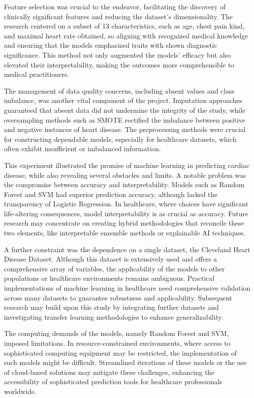 Feature selection was crucial to the endeavor, facilitating the discovery of clinically significant features and reducing the dataset's dimensionality. The research centered on a subset of 13 characteristics, such as age, chest pain kind, and maximal heart rate obtained, so aligning with recognized medical knowledge and ensuring that the models emphasized traits with shown diagnostic significance. This method not only augmented the models' efficacy but also elevated their interpretability, making the outcomes more comprehensible to medical practitioners.

The management of data quality concerns, including absent values and class imbalance, was another vital component of the project. Imputation approaches guaranteed that absent data did not undermine the integrity of the study, while oversampling methods such as SMOTE rectified the imbalance between positive and negative instances of heart disease. The preprocessing methods were crucial for constructing dependable models, especially for healthcare datasets, which often exhibit insufficient or imbalanced information.

This experiment illustrated the promise of machine learning in predicting cardiac disease, while also revealing several obstacles and limits. A notable problem was the compromise between accuracy and interpretability. Models such as Random Forest and SVM had superior prediction accuracy, although lacked the transparency of Logistic Regression. In healthcare, where choices have significant life-altering consequences, model interpretability is as crucial as accuracy. Future research may concentrate on creating hybrid methodologies that reconcile these two elements, like interpretable ensemble methods or explainable AI techniques.

A further constraint was the dependence on a single dataset, the Cleveland Heart Disease Dataset. Although this dataset is extensively used and offers a comprehensive array of variables, the applicability of the models to other populations or healthcare environments remains ambiguous. Practical implementations of machine learning in healthcare need comprehensive validation across many datasets to guarantee robustness and applicability. Subsequent research may build upon this study by integrating further datasets and investigating transfer learning methodologies to enhance generalizability.

The computing demands of the models, namely Random Forest and SVM, imposed limitations. In resource-constrained environments, where access to sophisticated computing equipment may be restricted, the implementation of such models might be difficult. Streamlined iterations of these models or the use of cloud-based solutions may mitigate these challenges, enhancing the accessibility of sophisticated prediction tools for healthcare professionals worldwide.

